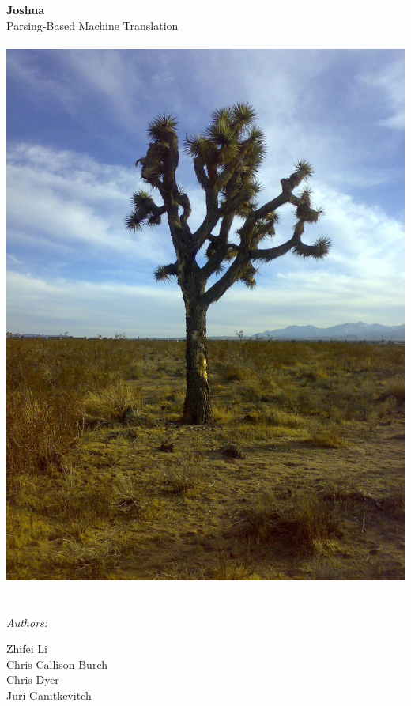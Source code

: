 \begin{titlepage}
\begin{center}
%
%
{\huge \bfseries
Joshua\\}
{ \Large
Parsing-Based Machine Translation\\} 
\ \\
%
\includegraphics[width=.8\linewidth]{images/joshua-tree}
\ \\
\ \\
\emph{Authors:}\\
\begin{minipage}{0.4\textwidth}
%
\begin{flushleft} \large
Zhifei Li\\
Chris Callison-Burch\\
Chris Dyer\\
Juri Ganitkevitch\\
\end{flushleft}
\end{minipage}
%
\begin{minipage}{0.4\textwidth}
\begin{flushright} \large

\end{flushright}
\end{minipage}
\end{center}
\end{titlepage}
